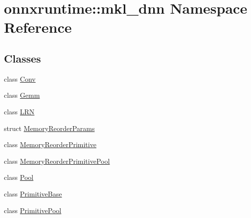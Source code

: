 \hypertarget{namespaceonnxruntime_1_1mkl__dnn}{}\section{onnxruntime\+:\+:mkl\+\_\+dnn Namespace Reference}
\label{namespaceonnxruntime_1_1mkl__dnn}
\subsection*{Classes}
\begin{DoxyCompactItemize}
\item 
class \mbox{\hyperlink{classonnxruntime_1_1mkl__dnn_1_1Conv}{Conv}}
\item 
class \mbox{\hyperlink{classonnxruntime_1_1mkl__dnn_1_1Gemm}{Gemm}}
\item 
class \mbox{\hyperlink{classonnxruntime_1_1mkl__dnn_1_1LRN}{L\+RN}}
\item 
struct \mbox{\hyperlink{structonnxruntime_1_1mkl__dnn_1_1MemoryReorderParams}{Memory\+Reorder\+Params}}
\item 
class \mbox{\hyperlink{classonnxruntime_1_1mkl__dnn_1_1MemoryReorderPrimitive}{Memory\+Reorder\+Primitive}}
\item 
class \mbox{\hyperlink{classonnxruntime_1_1mkl__dnn_1_1MemoryReorderPrimitivePool}{Memory\+Reorder\+Primitive\+Pool}}
\item 
class \mbox{\hyperlink{classonnxruntime_1_1mkl__dnn_1_1Pool}{Pool}}
\item 
class \mbox{\hyperlink{classonnxruntime_1_1mkl__dnn_1_1PrimitiveBase}{Primitive\+Base}}
\item 
class \mbox{\hyperlink{classonnxruntime_1_1mkl__dnn_1_1PrimitivePool}{Primitive\+Pool}}
\end{DoxyCompactItemize}
